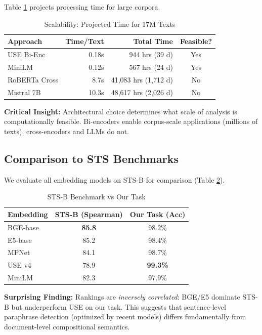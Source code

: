 \documentclass[11pt]{article}
\begin{document}
Table \ref{tab:scalability} projects processing time for large corpora.

\begin{table}[h]
\centering
\small
\caption{Scalability: Projected Time for 17M Texts}
\label{tab:scalability}
\begin{tabular}{lrrc}
\toprule
\textbf{Approach} & \textbf{Time/Text} & \textbf{Total Time} & \textbf{Feasible?} \\
\midrule
USE Bi-Enc & 0.18s & 944 hrs (39 d) & Yes \\
MiniLM & 0.12s & 567 hrs (24 d) & Yes \\
RoBERTa Cross & 8.7s & 41,083 hrs (1,712 d) & No \\
Mistral 7B & 10.3s & 48,617 hrs (2,026 d) & No \\
\bottomrule
\end{tabular}
\end{table}

\textbf{Critical Insight:} Architectural choice determines what scale of analysis is computationally feasible. Bi-encoders enable corpus-scale applications (millions of texts); cross-encoders and LLMs do not.

\subsection{Comparison to STS Benchmarks}

We evaluate all embedding models on STS-B \cite{Cer2017SemEval} for comparison (Table \ref{tab:sts_comparison}).

\begin{table}[h]
\centering
\small
\caption{STS-B Benchmark vs Our Task}
\label{tab:sts_comparison}
\begin{tabular}{lcc}
\toprule
\textbf{Embedding} & \textbf{STS-B (Spearman)} & \textbf{Our Task (Acc)} \\
\midrule
BGE-base & \textbf{85.8} & 98.2\% \\
E5-base & 85.2 & 98.4\% \\
MPNet & 84.1 & 98.7\% \\
USE v4 & 78.9 & \textbf{99.3\%} \\
MiniLM & 82.3 & 97.9\% \\
\bottomrule
\end{tabular}
\end{table}

\textbf{Surprising Finding:} Rankings are \textit{inversely correlated}: BGE/E5 dominate STS-B but underperform USE on our task. This suggests that sentence-level paraphrase detection (optimized by recent models) differs fundamentally from document-level compositional semantics.
\end{document}
